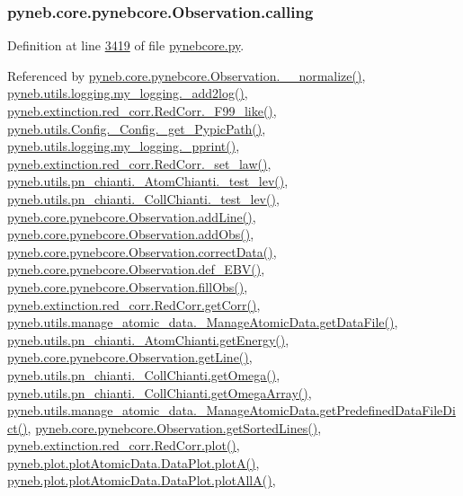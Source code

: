 \subsubsection[{calling}]{\setlength{\rightskip}{0pt plus 5cm}pyneb.\+core.\+pynebcore.\+Observation.\+calling}\label{classpyneb_1_1core_1_1pynebcore_1_1_observation_a2639fad9af4fefad20e4097295bd40e7}


Definition at line \hyperlink{pynebcore_8py_source_l03419}{3419} of file \hyperlink{pynebcore_8py_source}{pynebcore.\+py}.



Referenced by \hyperlink{pynebcore_8py_source_l03885}{pyneb.\+core.\+pynebcore.\+Observation.\+\_\+\+\_\+normalize()}, \hyperlink{logging_8py_source_l00059}{pyneb.\+utils.\+logging.\+my\+\_\+logging.\+\_\+add2log()}, \hyperlink{red__corr_8py_source_l00658}{pyneb.\+extinction.\+red\+\_\+corr.\+Red\+Corr.\+\_\+\+F99\+\_\+like()}, \hyperlink{_config_8py_source_l00086}{pyneb.\+utils.\+Config.\+\_\+\+Config.\+\_\+get\+\_\+\+Pypic\+Path()}, \hyperlink{logging_8py_source_l00051}{pyneb.\+utils.\+logging.\+my\+\_\+logging.\+\_\+pprint()}, \hyperlink{red__corr_8py_source_l00176}{pyneb.\+extinction.\+red\+\_\+corr.\+Red\+Corr.\+\_\+set\+\_\+law()}, \hyperlink{pn__chianti_8py_source_l00284}{pyneb.\+utils.\+pn\+\_\+chianti.\+\_\+\+Atom\+Chianti.\+\_\+test\+\_\+lev()}, \hyperlink{pn__chianti_8py_source_l00449}{pyneb.\+utils.\+pn\+\_\+chianti.\+\_\+\+Coll\+Chianti.\+\_\+test\+\_\+lev()}, \hyperlink{pynebcore_8py_source_l03436}{pyneb.\+core.\+pynebcore.\+Observation.\+add\+Line()}, \hyperlink{pynebcore_8py_source_l03467}{pyneb.\+core.\+pynebcore.\+Observation.\+add\+Obs()}, \hyperlink{pynebcore_8py_source_l03906}{pyneb.\+core.\+pynebcore.\+Observation.\+correct\+Data()}, \hyperlink{pynebcore_8py_source_l03861}{pyneb.\+core.\+pynebcore.\+Observation.\+def\+\_\+\+E\+B\+V()}, \hyperlink{pynebcore_8py_source_l03452}{pyneb.\+core.\+pynebcore.\+Observation.\+fill\+Obs()}, \hyperlink{red__corr_8py_source_l00211}{pyneb.\+extinction.\+red\+\_\+corr.\+Red\+Corr.\+get\+Corr()}, \hyperlink{manage__atomic__data_8py_source_l00297}{pyneb.\+utils.\+manage\+\_\+atomic\+\_\+data.\+\_\+\+Manage\+Atomic\+Data.\+get\+Data\+File()}, \hyperlink{pn__chianti_8py_source_l00346}{pyneb.\+utils.\+pn\+\_\+chianti.\+\_\+\+Atom\+Chianti.\+get\+Energy()}, \hyperlink{pynebcore_8py_source_l03543}{pyneb.\+core.\+pynebcore.\+Observation.\+get\+Line()}, \hyperlink{pn__chianti_8py_source_l00484}{pyneb.\+utils.\+pn\+\_\+chianti.\+\_\+\+Coll\+Chianti.\+get\+Omega()}, \hyperlink{pn__chianti_8py_source_l00461}{pyneb.\+utils.\+pn\+\_\+chianti.\+\_\+\+Coll\+Chianti.\+get\+Omega\+Array()}, \hyperlink{manage__atomic__data_8py_source_l00034}{pyneb.\+utils.\+manage\+\_\+atomic\+\_\+data.\+\_\+\+Manage\+Atomic\+Data.\+get\+Predefined\+Data\+File\+Dict()}, \hyperlink{pynebcore_8py_source_l03562}{pyneb.\+core.\+pynebcore.\+Observation.\+get\+Sorted\+Lines()}, \hyperlink{red__corr_8py_source_l00303}{pyneb.\+extinction.\+red\+\_\+corr.\+Red\+Corr.\+plot()}, \hyperlink{plot_atomic_data_8py_source_l00116}{pyneb.\+plot.\+plot\+Atomic\+Data.\+Data\+Plot.\+plot\+A()}, \hyperlink{plot_atomic_data_8py_source_l00188}{pyneb.\+plot.\+plot\+Atomic\+Data.\+Data\+Plot.\+plot\+All\+A()}, 